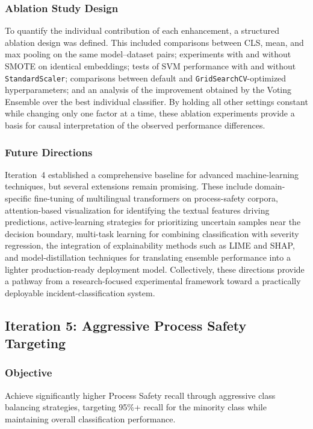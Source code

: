 \documentclass[11pt, titlepage, bibliography=totoc]{scrreprt}
\begin{document}
\subsubsection{Ablation Study Design}
To quantify the individual contribution of each enhancement, a structured ablation design was defined. This included comparisons between CLS, mean, and max pooling on the same model--dataset pairs; experiments with and without SMOTE on identical embeddings; tests of SVM performance with and without \texttt{StandardScaler}; comparisons between default and \texttt{GridSearchCV}-optimized hyperparameters; and an analysis of the improvement obtained by the Voting Ensemble over the best individual classifier. By holding all other settings constant while changing only one factor at a time, these ablation experiments provide a basis for causal interpretation of the observed performance differences.

\subsubsection{Future Directions}
Iteration~4 established a comprehensive baseline for advanced machine-learning techniques, but several extensions remain promising. These include domain-specific fine-tuning of multilingual transformers on process-safety corpora, attention-based visualization for identifying the textual features driving predictions, active-learning strategies for prioritizing uncertain samples near the decision boundary, multi-task learning for combining classification with severity regression, the integration of explainability methods such as LIME and SHAP, and model-distillation techniques for translating ensemble performance into a lighter production-ready deployment model. Collectively, these directions provide a pathway from a research-focused experimental framework toward a practically deployable incident-classification system.

\subsection{Iteration 5: Aggressive Process Safety Targeting}

\subsubsection{Objective}
Achieve significantly higher Process Safety recall through aggressive class balancing strategies, targeting 95\%+ recall for the minority class while maintaining overall classification performance.
\end{document}
